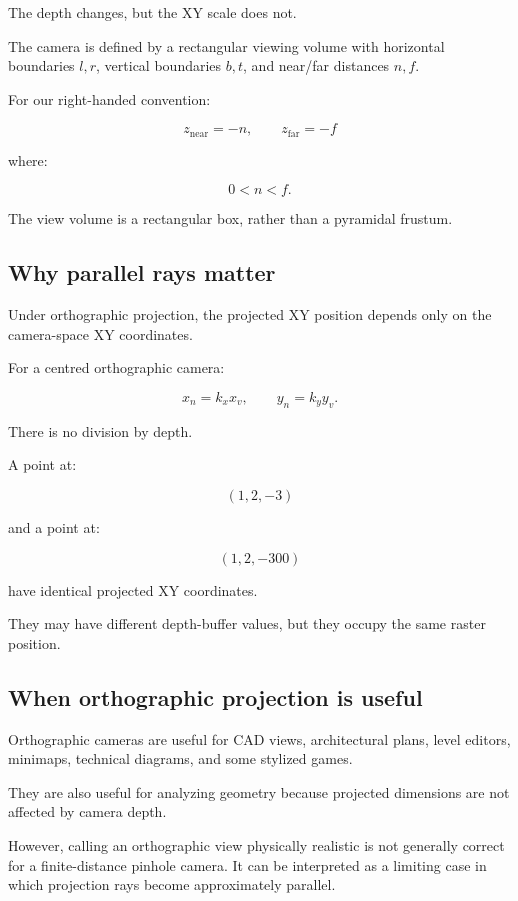 The depth changes, but the XY scale does not.

The camera is defined by a rectangular viewing volume with horizontal boundaries \(l,r\), vertical boundaries \(b,t\), and near/far distances \(n,f\).

For our right-handed convention:

\[
 z_{\mathrm{near}}=-n, \qquad z_{\mathrm{far}}=-f
\]

where:

\[
 0<n<f.
\]

The view volume is a rectangular box, rather than a pyramidal frustum.

\subsection{Why parallel rays matter}\label{02-foundations-ii-ch033-why-parallel-rays-matter}

Under orthographic projection, the projected XY position depends only on the camera-space XY coordinates.

For a centred orthographic camera:

\[
 x_n=k_xx_v, \qquad y_n=k_yy_v.
\]

There is no division by depth.

A point at:

\[
 (1,2,-3)
\]

and a point at:

\[
 (1,2,-300)
\]

have identical projected XY coordinates.

They may have different depth-buffer values, but they occupy the same raster position.

\subsection{When orthographic projection is useful}\label{02-foundations-ii-ch033-when-orthographic-projection-is-useful}

Orthographic cameras are useful for CAD views, architectural plans, level editors, minimaps, technical diagrams, and some stylized games.

They are also useful for analyzing geometry because projected dimensions are not affected by camera depth.

However, calling an orthographic view physically realistic is not generally correct for a finite-distance pinhole camera. It can be interpreted as a limiting case in which projection rays become approximately parallel.

